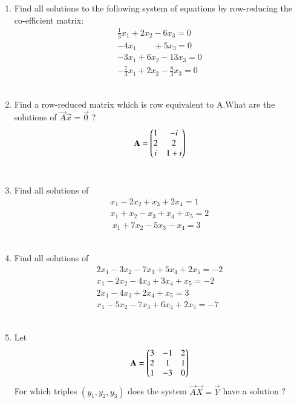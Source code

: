 \renewcommand{\theequation}{\theenumi}
\renewcommand{\thefigure}{\theenumi}
\begin{enumerate}[label=\thesubsection.\arabic*.,ref=\thesubsection.\theenumi]
%
\item Find all solutions to the following system of equations by row-reducing the co-efficient matrix:
\begin{align}
\frac{1}{3}x_1 +2x_2 - 6x_3 =0\\
-4x_1\quad \quad+ 5x_3=0\\
-3x_1+6x_2-13x_3=0\\
-\frac{7}{3}x_1 +2x_2 - \frac{8}{3}x_3 =0
\end{align}
\\
\solution

%
\item Find a row-reduced matrix which is row equivalent to A.What are the solutions of 
$\vec{A}\vec{x}=\vec{0}$ ?
\begin{align}
\mathbf{A} = \begin{pmatrix}1&-i\\2&2\\i& 1+i\end{pmatrix}\label{eq:solutions/1/3/2/A}
\end{align}
%
\\
\solution

%
\item Find all solutions of
 \begin{align}
 x_1-2x_2+x_3+2x_4=1 \nonumber\\
 x_1+x_2-x_3+x_4+x_5=2\nonumber\\\
 x_1+7x_2-5x_3-x_4=3\nonumber\
 \end{align}
%
\\
\solution

%
\item Find all solutions of
 \begin{align}
 2x_1-3x_2-7x_3+5x_4+2x_5=-2\\x_1-2x_2-4x_3+3x_4+x_5=-2\\2x_1-4x_3+2x_4+x_5=3\\x_1-5x_2-7x_3+6x_4+2x_5=-7
 \end{align}
%
\\
\solution

\item Let
\begin{align}
    \mathbf{A}=\begin{pmatrix}3 & -1 & 2\\2 & 1 & 1\\1 & -3 & 0\end{pmatrix} 
\end{align}
For which triples $(y_1,y_2,y_3)$ does the system $\vec{A}\vec{X}=\vec{Y}$ have a solution ? 

\end{enumerate}
